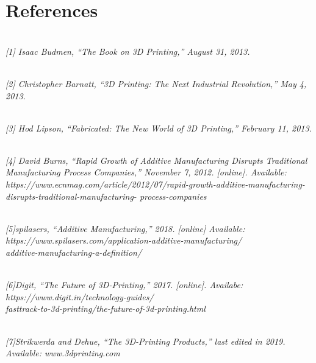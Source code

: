 \documentclass[12pt,a4paper]{report}
\begin{document}
	
	\chapter*{References}
	\indent
	\\\emph{[1] Isaac Budmen, “The Book on 3D Printing,” August 31, 2013.}\par
	\indent
	\\ \emph{[2] Christopher Barnatt, “3D Printing: The Next Industrial Revolution,” May 4, 2013.}\par
	\indent
	\\\emph{[3] Hod Lipson, “Fabricated: The New World of 3D Printing,” February 11, 2013.}\par
	\indent
	\\\emph{[4] David Burns, “Rapid Growth of Additive Manufacturing Disrupts Traditional Manufacturing Process Companies,”
		November 7, 2012. [online]. Available:
		https://www.ecnmag.com/article/2012/07/rapid-growth-additive-manufacturing-disrupts-traditional-manufacturing- process-companies}\par
	\indent
	\\\emph{[5]spilasers, “Additive Manufacturing,” 2018. [online]
		Available: \\https://www.spilasers.com/application-additive-manufacturing/\\additive-manufacturing-a-definition/}\par
	
	\indent
	\\\emph{[6]Digit, “The Future of 3D-Printing,” 2017. [online].
		Availabe: \\https://www.digit.in/technology-guides/\\fasttrack-to-3d-printing/the-future-of-3d-printing.html}\par
	\indent
	\\\emph{[7]Strikwerda and Dehue, “The 3D-Printing Products,” last edited in 2019.\\
		Available: www.3dprinting.com}\par
\end{document}
